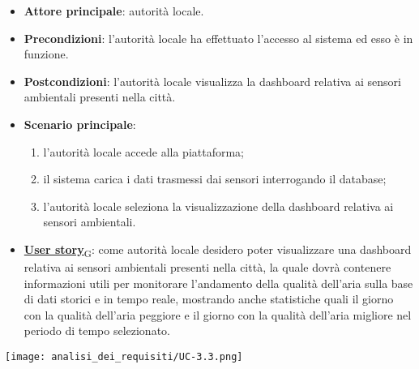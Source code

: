 \begin{itemize}
	\item \textbf{Attore principale}: autorità locale.
	\item \textbf{Precondizioni}: l'autorità locale ha effettuato l'accesso al sistema ed esso è in funzione.
	\item \textbf{Postcondizioni}: l'autorità locale visualizza la dashboard relativa
	      ai sensori ambientali presenti nella città.
	\item \textbf{Scenario principale}:
	      \begin{enumerate}
		      \item l'autorità locale accede alla piattaforma;
		      \item il sistema carica i dati trasmessi dai sensori interrogando il database;
		      \item l'autorità locale seleziona la visualizzazione della dashboard relativa ai sensori ambientali.
	      \end{enumerate}
	\item \href{https://7last.github.io/docs/pb/documentazione-interna/glossario\#user-story}{\textbf{User story}\textsubscript{G}}:
	      come autorità locale desidero poter visualizzare una dashboard relativa ai sensori ambientali presenti nella città, la quale
	      dovrà contenere informazioni utili per monitorare l'andamento della qualità dell'aria sulla base di dati storici e in tempo reale, mostrando
	      anche statistiche quali il giorno con la qualità dell'aria peggiore e il giorno con la qualità dell'aria migliore nel periodo di tempo selezionato.
\end{itemize}
\begin{center}
	\texttt{[image: analisi\_dei\_requisiti/UC-3.3.png]}
\end{center}


